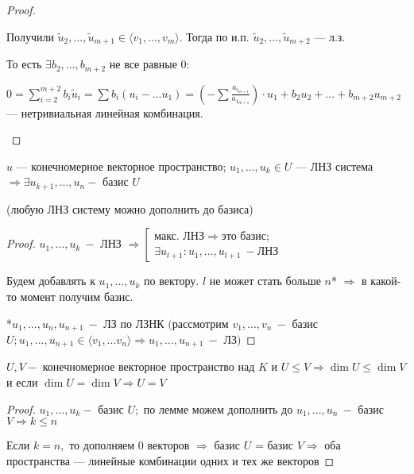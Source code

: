 \begin{proof}
\begin{enumerate}
\begin{enumerate}
            Получили $\tilde{u}_2,...,\tilde{u}_{m+1}\in \langle v_1, 
...,v_m\rangle$. Тогда по и.п. $\tilde{u}_{2},...,\tilde{u}_{m+2}$ — л.з.
            
            То есть $\exists b_2,...,b_{m+2}$ не все равные 0:
            
            $0=\sum\limits_{i=2}^{m+2}b_i\tilde{u}_i=\sum 
b_i(u_i-...u_{1})=(-\sum\frac{a_{i_{m+1}}}{a_{1_{m+1}}})\cdot 
u_1+b_2u_2+...+b_{m+2}u_{m+2}$ — нетривиальная линейная комбинация.
        \end{enumerate}
    \end{enumerate}
\end{proof}

\begin{lemma}
    $u$ — конечномерное векторное пространство; $u_1,...,u_k\in U$ — ЛНЗ 
система $\Rightarrow \exists u_{k+1},...,u_n-$ базис $U$
    
    (любую ЛНЗ систему можно дополнить до базиса)
\end{lemma}

\begin{proof}
    $u_1,...,u_k\ -$ ЛНЗ $\Rightarrow \left[\begin{gathered} \text{макс. 
ЛНЗ}\Rightarrow \text{это базис}; \\ \exists u_{l+1}:u_1,...,u_{l+1}\ 
-\text{ЛНЗ} \end{gathered}\right.$
    
    Будем добавлять к $u_1,...,u_k$ по вектору. $l$ не может стать больше 
$n$* $\Rightarrow$  в какой-то момент получим базис.
    
    *$u_1,...,u_n,u_{n+1}\ -$ ЛЗ по ЛЗНК $($рассмотрим $v_1,...,v_n\ -$ 
базис $U;u_1,...,u_{n+1}\in\langle v_1,...v_n\rangle\Rightarrow 
u_1,...,u_{n+1}\ -$  ЛЗ$)$
\end{proof}

\begin{corollary}
    $U,V-$ конечномерное векторное пространство над $K$ и $U\leq 
V\Rightarrow \dim U\leq \dim V$ и если $\dim U=\dim V\Rightarrow U=V$ 
\end{corollary}

\begin{proof}
    $u_1,...,u_k-$ базис $U;$ по лемме можем дополнить до $u_1,...,u_n\ -$ 
базис $V\Rightarrow k\leq n$ 
    
    Если $k=n,$ то дополняем 0 векторов $\Rightarrow$  базис $U$ = базис 
$V\Rightarrow$ оба пространства — линейные комбинации одних и тех же 
векторов
\end{proof}

